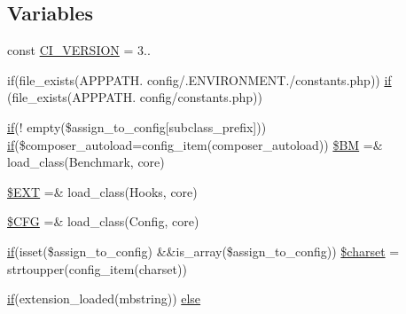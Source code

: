 \subsection*{Variables}
\begin{DoxyCompactItemize}
\item 
const \mbox{\hyperlink{_code_igniter_8php_a32e3c3927ba8ec93df92327dfd85d564}{C\+I\+\_\+\+V\+E\+R\+S\+I\+ON}} = \textquotesingle{}3..\textquotesingle{}
\item 
if(file\+\_\+exists(A\+P\+P\+P\+A\+T\+H. \textquotesingle{}config/\textquotesingle{}.E\+N\+V\+I\+R\+O\+N\+M\+E\+N\+T.\textquotesingle{}/constants.\+php\textquotesingle{})) \mbox{\hyperlink{_code_igniter_8php_a68ca62d45495d195f67d234bdafb1d1f}{if}} (file\+\_\+exists(A\+P\+P\+P\+A\+T\+H. \textquotesingle{}config/constants.\+php\textquotesingle{}))
\item 
\mbox{\hyperlink{_code_igniter_8php_a68ca62d45495d195f67d234bdafb1d1f}{if}}(! empty(\$assign\+\_\+to\+\_\+config\mbox{[}\textquotesingle{}subclass\+\_\+prefix\textquotesingle{}\mbox{]})) \mbox{\hyperlink{_code_igniter_8php_a68ca62d45495d195f67d234bdafb1d1f}{if}}(\$composer\+\_\+autoload=config\+\_\+item(\textquotesingle{}composer\+\_\+autoload\textquotesingle{})) \mbox{\hyperlink{_code_igniter_8php_a13e4265227a370a54765a330eaa5b111}{\$\+BM}} =\& load\+\_\+class(\textquotesingle{}Benchmark\textquotesingle{}, \textquotesingle{}core\textquotesingle{})
\item 
\mbox{\hyperlink{_code_igniter_8php_ab97aae9bc0aae04b84d360a29a3c035b}{\$\+E\+XT}} =\& load\+\_\+class(\textquotesingle{}Hooks\textquotesingle{}, \textquotesingle{}core\textquotesingle{})
\item 
\mbox{\hyperlink{_code_igniter_8php_adb9373e11e42b2cd55d1fe249ae72deb}{\$\+C\+FG}} =\& load\+\_\+class(\textquotesingle{}Config\textquotesingle{}, \textquotesingle{}core\textquotesingle{})
\item 
\mbox{\hyperlink{_code_igniter_8php_a68ca62d45495d195f67d234bdafb1d1f}{if}}(isset(\$assign\+\_\+to\+\_\+config) \&\&is\+\_\+array(\$assign\+\_\+to\+\_\+config)) \mbox{\hyperlink{_code_igniter_8php_a7e7d4efeadded7c1817a6313303f81f4}{\$charset}} = strtoupper(config\+\_\+item(\textquotesingle{}charset\textquotesingle{}))
\item 
\mbox{\hyperlink{_code_igniter_8php_a68ca62d45495d195f67d234bdafb1d1f}{if}}(extension\+\_\+loaded(\textquotesingle{}mbstring\textquotesingle{})) \mbox{\hyperlink{_code_igniter_8php_a6574dda0394726f334fcb9695654b02e}{else}}
\item 

\end{DoxyCompactItemize}
